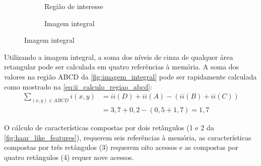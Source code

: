 \begin{figure}[htbp]
\begin{subfigure}[c]{0.3\textwidth}
    \caption{Região de interesse}
    \end{subfigure}%
    \begin{subfigure}[c]{0.3\textwidth}
    \centering
    \caption{Imagem integral}
    \end{subfigure}%
\end{figure}

Utilizando a imagem integral, a soma dos níveis de cinza de qualquer área retangular pode ser calculada em quatro referências à memória. A soma dos valores na região ABCD da \autoref{fig:imagem_integral} pode ser rapidamente calculada como mostrado na \autoref{eq:ii_calculo_regiao_abcd}:
%
\begin{align} \label{eq:ii_calculo_regiao_abcd}
    \sum_{(x,y) \in ABCD} i(x,y) &= ii(D) + ii(A) - (ii(B) + ii(C))\\
                                 &= 3,7 + 0,2 - (0,5 + 1,7) = 1,7\nonumber
\end{align}

O cálculo de características compostas por dois retângulos (1 e 2 da \autoref{fig:haar_like_features}), requerem seis referências à memória, as características compostas por três retângulos (3) requerem oito acessos e as compostas por quatro retângulos (4) requer nove acessos.


